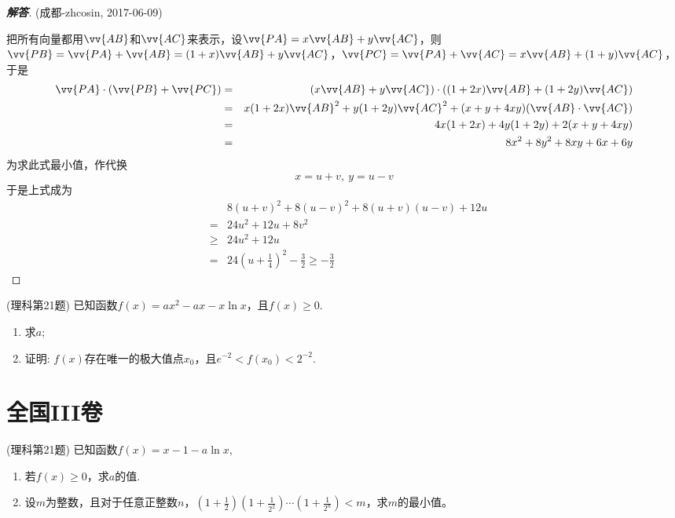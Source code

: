 \documentclass{ctexart}
\begin{document}
\begin{proof}[\textbf{解答}](成都-zhcosin, 2017-06-09)

  把所有向量都用$\vv{AB}$和$\vv{AC}$来表示，设$\vv{PA}=x\vv{AB}+y\vv{AC}$，则$\vv{PB}=\vv{PA}+\vv{AB}=(1+x)\vv{AB}+y\vv{AC}$，$\vv{PC}=\vv{PA}+\vv{AC}=x\vv{AB}+(1+y)\vv{AC}$，于是
  \begin{eqnarray*}
    \vv{PA} \cdot (\vv{PB}+\vv{PC}) & = & (x\vv{AB}+y\vv{AC}) \cdot ((1+2x)\vv{AB}+(1+2y)\vv{AC}) \\
                                    & = & x(1+2x)\vv{AB}^2+y(1+2y)\vv{AC}^2+(x+y+4xy)(\vv{AB} \cdot \vv{AC}) \\
                                    & = & 4x(1+2x)+4y(1+2y)+2(x+y+4xy) \\
    & = & 8x^2+8y^2+8xy+6x+6y
  \end{eqnarray*}
  为求此式最小值，作代换
  \[ x=u+v, \  y=u-v \]
  于是上式成为
  \begin{eqnarray*}
    & & 8(u+v)^2+8(u-v)^2+8(u+v)(u-v)+12u \\
    & = & 24u^2+12u+8v^2 \\
    & \geqslant & 24u^2+12u \\
    & = & 24 \left( u+\frac{1}{4} \right)^2-\frac{3}{2} \geqslant -\frac{3}{2}
  \end{eqnarray*}
\end{proof}

\begin{exercise}(理科第21题)
  已知函数$f(x)=ax^2-ax-x\ln{x}$，且$f(x) \geqslant 0$.
  \begin{enumerate}
  \item 求$a$;
  \item 证明: $f(x)$存在唯一的极大值点$x_0$，且$e^{-2}<f(x_0)<2^{-2}$.
  \end{enumerate}
\end{exercise}

\section{全国III卷}
\label{sec:nation-3}

\begin{exercise}(理科第21题)
  已知函数$f(x)=x-1-a\ln{x}$,
  \begin{enumerate}
  \item 若$f(x) \geqslant 0$，求$a$的值.
  \item 设$m$为整数，且对于任意正整数$n$，$\left( 1+\frac{1}{2} \right)\left( 1+\frac{1}{2^2} \right) \cdots \left( 1+\frac{1}{2^n} \right) <m$，求$m$的最小值。
  \end{enumerate}
\end{exercise}
\end{document}
